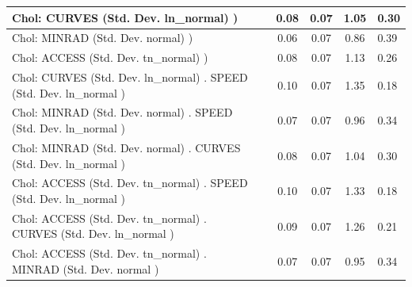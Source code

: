 \begin{table}
\begin{center}
\begin{tabular}{|l|l|c|c|c|l|}
			 Chol: CURVES (Std. Dev. ln_normal) ) &  & 0.08 & 0.07 & 1.05 & 0.30 \\
			\hline
			 Chol: MINRAD (Std. Dev. normal) ) &  & 0.06 & 0.07 & 0.86 & 0.39 \\
			\hline
			 Chol: ACCESS (Std. Dev. tn_normal) ) &  & 0.08 & 0.07 & 1.13 & 0.26 \\
			\hline
			 Chol: CURVES (Std. Dev. ln_normal) . SPEED (Std. Dev.   ln_normal ) &  & 0.10 & 0.07 & 1.35 & 0.18 \\
			\hline
			 Chol: MINRAD (Std. Dev. normal) . SPEED (Std. Dev.   ln_normal ) &  & 0.07 & 0.07 & 0.96 & 0.34 \\
			\hline
			 Chol: MINRAD (Std. Dev. normal) . CURVES (Std. Dev.   ln_normal ) &  & 0.08 & 0.07 & 1.04 & 0.30 \\
			\hline
			 Chol: ACCESS (Std. Dev. tn_normal) . SPEED (Std. Dev.   ln_normal ) &  & 0.10 & 0.07 & 1.33 & 0.18 \\
			\hline
			 Chol: ACCESS (Std. Dev. tn_normal) . CURVES (Std. Dev.   ln_normal ) &  & 0.09 & 0.07 & 1.26 & 0.21 \\
			\hline
			 Chol: ACCESS (Std. Dev. tn_normal) . MINRAD (Std. Dev.   normal ) &  & 0.07 & 0.07 & 0.95 & 0.34 \\
			\hline
		\end{tabular}
	\end{center}
\end{table}